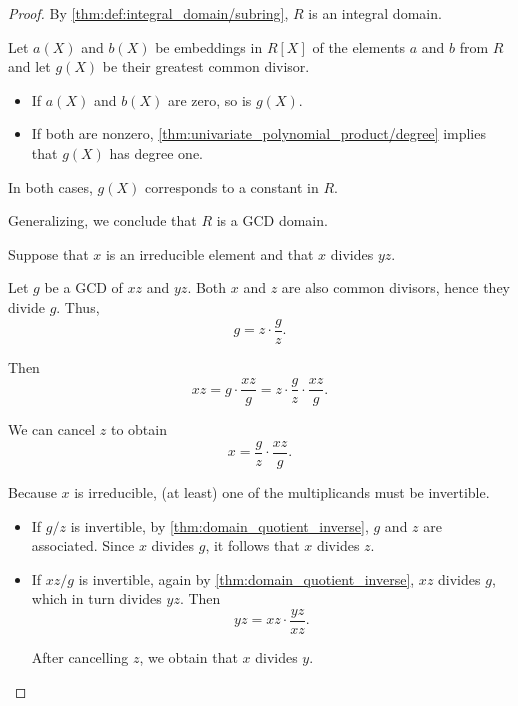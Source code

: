 \begin{proof}
   By \cref{thm:def:integral_domain/subring}, \( R \) is an integral domain.

  Let \( a(X) \) and \( b(X) \) be embeddings in \( R[X] \) of the elements \( a \) and \( b \) from \( R \) and let \( g(X) \) be their greatest common divisor.

  \begin{itemize}
    \item If \( a(X) \) and \( b(X) \) are zero, so is \( g(X) \).
    \item If both are nonzero, \cref{thm:univariate_polynomial_product/degree} implies that \( g(X) \) has degree one.
  \end{itemize}

  In both cases, \( g(X) \) corresponds to a constant in \( R \).

  Generalizing, we conclude that \( R \) is a GCD domain.

   Suppose that \( x \) is an irreducible element and that \( x \) divides \( yz \).

  Let \( g \) be a GCD of \( xz \) and \( yz \). Both \( x \) and \( z \) are also common divisors, hence they divide \( g \). Thus,
  \begin{equation*}
    g = z \cdot \frac g z.
  \end{equation*}

  Then
  \begin{equation*}
    xz = g \cdot \frac {xz} g = z \cdot \frac g z \cdot \frac {xz} g.
  \end{equation*}

  We can cancel \( z \) to obtain
  \begin{equation*}
    x = \frac g z \cdot \frac {xz} g.
  \end{equation*}

  Because \( x \) is irreducible, (at least) one of the multiplicands must be invertible.
  \begin{itemize}
    \item If \( g / z \) is invertible, by \cref{thm:domain_quotient_inverse}, \( g \) and \( z \) are associated. Since \( x \) divides \( g \), it follows that \( x \) divides \( z \).

    \item If \( xz / g \) is invertible, again by \cref{thm:domain_quotient_inverse}, \( xz \) divides \( g \), which in turn divides \( yz \). Then
    \begin{equation*}
      yz = xz \cdot \frac {yz} {xz}.
    \end{equation*}

    After cancelling \( z \), we obtain that \( x \) divides \( y \).
  \end{itemize}
\end{proof}

